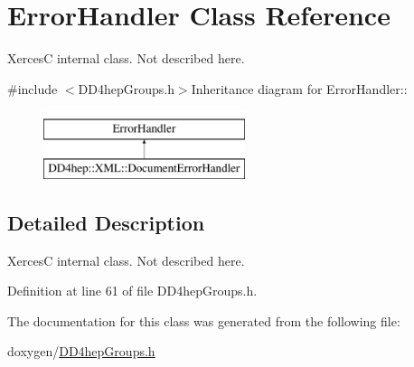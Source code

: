 \hypertarget{class_error_handler}{
\section{ErrorHandler Class Reference}
\label{class_error_handler}
}


XercesC internal class. Not described here.  


{\ttfamily \#include $<$DD4hepGroups.h$>$}Inheritance diagram for ErrorHandler::\begin{figure}[H]
\begin{center}
\leavevmode
\includegraphics[height=2cm]{class_error_handler}
\end{center}
\end{figure}


\subsection{Detailed Description}
XercesC internal class. Not described here. 

Definition at line 61 of file DD4hepGroups.h.

The documentation for this class was generated from the following file:\begin{DoxyCompactItemize}
\item 
doxygen/\hyperlink{_d_d4hep_groups_8h}{DD4hepGroups.h}\end{DoxyCompactItemize}
